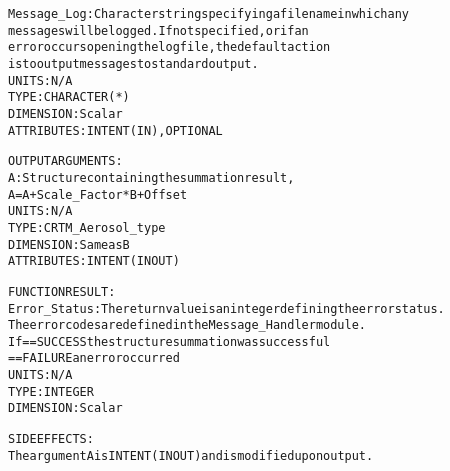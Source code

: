 \begin{alltt}
        Message_Log:   Character string specifying a filename in which any
                       messages will be logged. If not specified, or if an
                       error occurs opening the log file, the default action
                       is to output messages to standard output.
                       UNITS:      N/A
                       TYPE:       CHARACTER(*)
                       DIMENSION:  Scalar
                       ATTRIBUTES: INTENT(IN), OPTIONAL
 
  OUTPUT ARGUMENTS:
        A:             Structure containing the summation result,
                         A = A + Scale_Factor*B + Offset
                       UNITS:      N/A
                       TYPE:       CRTM_Aerosol_type
                       DIMENSION:  Same as B
                       ATTRIBUTES: INTENT(IN OUT)
 
 
  FUNCTION RESULT:
        Error_Status:  The return value is an integer defining the error status.
                       The error codes are defined in the Message_Handler module.
                       If == SUCCESS the structure summation was successful
                          == FAILURE an error occurred
                       UNITS:      N/A
                       TYPE:       INTEGER
                       DIMENSION:  Scalar
 
  SIDE EFFECTS:
        The argument A is INTENT(IN OUT) and is modified upon output.
 
  \end{alltt}
